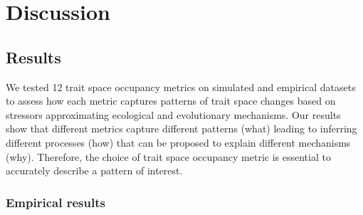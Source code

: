 \documentclass[12pt,letterpaper]{article}
\begin{document}
\section{Discussion}

\subsection{Results}

We tested 12 trait space occupancy metrics on simulated and empirical datasets to assess how each metric captures patterns of trait space changes based on stressors approximating ecological and evolutionary mechanisms.
Our results show that different metrics capture different patterns (what) leading to inferring different processes (how) that can be proposed to explain different mechanisms (why).
Therefore, the choice of trait space occupancy metric is essential to accurately describe a pattern of interest.

\subsubsection{Empirical results}
\end{document}
